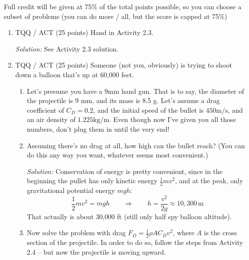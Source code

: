 \documentclass[12pt]{article}
\newcommand{\s}{\textrm{s}}
\newcommand{\m}{\textrm{m}}
\newcommand{\kg}{\textrm{kg}}
\newcommand{\soln}[1] {\textit{Solution:} #1}
\begin{document}
Full credit will be given at 75\% of the total points possible, so you can choose a subset of problems (you can do more / all, but the score is capped at 75\%)

\begin{enumerate}
  \item TQQ / ACT (25 points) Hand in Activity 2.3.

        \soln{See Activity 2.3 solution.}

  \item TQQ / ACT (25 points) Someone (not you, obviously) is trying to shoot down a balloon that's up at 60,000 feet.

        \begin{enumerate}
          \item Let's presume you have a 9mm hand gun. That is to say, the diameter of the projectile is 9 mm, and its mass is 8.5 g. Let's assume a drag coefficient of $C_D = 0.2$, and the initial speed of the bullet is $450 \m/\s$, and an air density of $1.225 \kg/\m$. Even though now I've given you all those numbers, don't plug them in until the very end!

          \item Assuming there's no drag at all, how high can the bullet reach? (You can do this any way you want, whatever seems most convenient.)

                \soln{Conservation of energy is pretty convenient, since in the beginning the pullet has only kinetic energy $\frac{1}{2}mv^2$, and at the peak, only gravitational potential energy $mgh$:
                  $$
                    \frac{1}{2}mv^2 = mgh \qquad \Longrightarrow \qquad h = \frac{v^2}{2g} \approx 10,300\,\m
                  $$
                  That actually is about 30,000 ft (still only half spy balloon altitude).
                }

          \item Now solve the problem with drag $F_D = \frac{1}{2} \rho A C_D v^2$, where $A$ is the cross section of the projectile. In order to do so, follow the steps from Activity 2.4 -- but now the projectile is moving upward.


\end{enumerate}
\end{enumerate}
\end{document}
